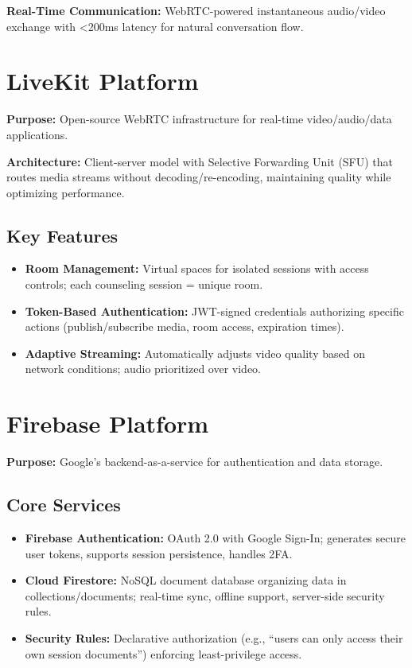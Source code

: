 \documentclass[11pt,a4paper]{report}
\begin{document}
\textbf{Real-Time Communication:} WebRTC-powered instantaneous audio/video exchange with <200ms latency for natural conversation flow.

\section{LiveKit Platform}

\textbf{Purpose:} Open-source WebRTC infrastructure for real-time video/audio/data applications.

\textbf{Architecture:} Client-server model with Selective Forwarding Unit (SFU) that routes media streams without decoding/re-encoding, maintaining quality while optimizing performance.

\subsection{Key Features}
\begin{itemize}
    \item \textbf{Room Management:} Virtual spaces for isolated sessions with access controls; each counseling session = unique room.
    \item \textbf{Token-Based Authentication:} JWT-signed credentials authorizing specific actions (publish/subscribe media, room access, expiration times).
    \item \textbf{Adaptive Streaming:} Automatically adjusts video quality based on network conditions; audio prioritized over video.
\end{itemize}

\section{Firebase Platform}

\textbf{Purpose:} Google's backend-as-a-service for authentication and data storage.

\subsection{Core Services}
\begin{itemize}
    \item \textbf{Firebase Authentication:} OAuth 2.0 with Google Sign-In; generates secure user tokens, supports session persistence, handles 2FA.
    \item \textbf{Cloud Firestore:} NoSQL document database organizing data in collections/documents; real-time sync, offline support, server-side security rules.
    \item \textbf{Security Rules:} Declarative authorization (e.g., ``users can only access their own session documents'') enforcing least-privilege access.
\end{itemize}
\end{document}

